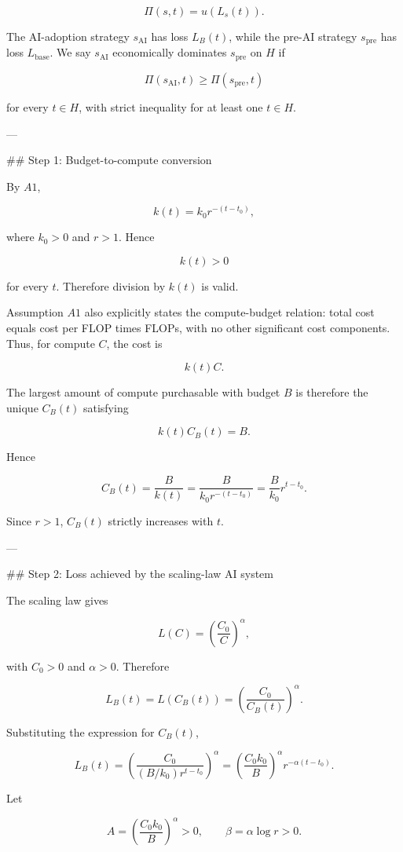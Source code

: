 \[
\Pi(s,t)=u(L_s(t)).
\]

The AI-adoption strategy \(s_{\mathrm{AI}}\) has loss \(L_B(t)\), while the pre-AI strategy \(s_{\mathrm{pre}}\) has loss \(L_{\mathrm{base}}\). We say \(s_{\mathrm{AI}}\) economically dominates \(s_{\mathrm{pre}}\) on \(H\) if

\[
\Pi(s_{\mathrm{AI}},t)\geq \Pi(s_{\mathrm{pre}},t)
\]

for every \(t\in H\), with strict inequality for at least one \(t\in H\).

---

## Step 1: Budget-to-compute conversion

By \(A1\),

\[
k(t)=k_0 r^{-(t-t_0)},
\]

where \(k_0>0\) and \(r>1\). Hence

\[
k(t)>0
\]

for every \(t\). Therefore division by \(k(t)\) is valid.

Assumption \(A1\) also explicitly states the compute-budget relation: total cost equals cost per FLOP times FLOPs, with no other significant cost components. Thus, for compute \(C\), the cost is

\[
k(t)C.
\]

The largest amount of compute purchasable with budget \(B\) is therefore the unique \(C_B(t)\) satisfying

\[
k(t)C_B(t)=B.
\]

Hence

\[
C_B(t)=\frac{B}{k(t)}
      =\frac{B}{k_0 r^{-(t-t_0)}}
      =\frac{B}{k_0}r^{t-t_0}.
\]

Since \(r>1\), \(C_B(t)\) strictly increases with \(t\).

---

## Step 2: Loss achieved by the scaling-law AI system

The scaling law gives

\[
L(C)=\left(\frac{C_0}{C}\right)^\alpha,
\]

with \(C_0>0\) and \(\alpha>0\). Therefore

\[
L_B(t)
=
L(C_B(t))
=
\left(\frac{C_0}{C_B(t)}\right)^\alpha.
\]

Substituting the expression for \(C_B(t)\),

\[
L_B(t)
=
\left(\frac{C_0}{(B/k_0)r^{t-t_0}}\right)^\alpha
=
\left(\frac{C_0k_0}{B}\right)^\alpha r^{-\alpha(t-t_0)}.
\]

Let

\[
A=\left(\frac{C_0k_0}{B}\right)^\alpha>0,
\qquad
\beta=\alpha\log r>0.
\]

